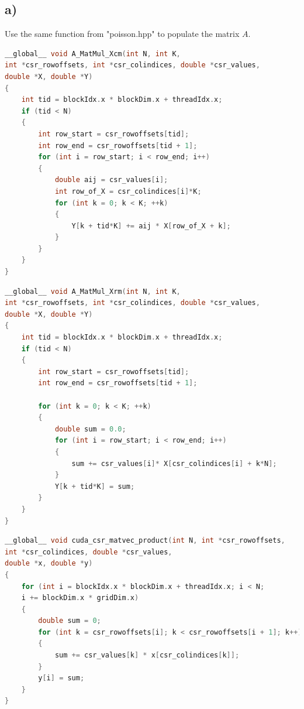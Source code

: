 \documentclass[11pt,a4paper]{article}
\begin{document}
 \subsection*{a)}
Use the same function from "poisson.hpp" to populate the matrix $A$. 
  \begin{lstlisting}[language=C++, caption={Kernel for Column-Major}]
__global__ void A_MatMul_Xcm(int N, int K,
int *csr_rowoffsets, int *csr_colindices, double *csr_values,
double *X, double *Y)
{
	int tid = blockIdx.x * blockDim.x + threadIdx.x; 
	if (tid < N)
	{
		int row_start = csr_rowoffsets[tid];
		int row_end = csr_rowoffsets[tid + 1];
		for (int i = row_start; i < row_end; i++) 
		{
			double aij = csr_values[i];
			int row_of_X = csr_colindices[i]*K;
			for (int k = 0; k < K; ++k)
			{
				Y[k + tid*K] += aij * X[row_of_X + k];
			}
		}
	}
}
 \end{lstlisting}
 
\begin{lstlisting}[language=C++, caption={Kernel for Row-Major}]
__global__ void A_MatMul_Xrm(int N, int K,
int *csr_rowoffsets, int *csr_colindices, double *csr_values,
double *X, double *Y)
{
	int tid = blockIdx.x * blockDim.x + threadIdx.x; 
	if (tid < N)
	{
		int row_start = csr_rowoffsets[tid];
		int row_end = csr_rowoffsets[tid + 1];
		
		for (int k = 0; k < K; ++k)
		{
			double sum = 0.0;
			for (int i = row_start; i < row_end; i++) 
			{
				sum += csr_values[i]* X[csr_colindices[i] + k*N];
			}
			Y[k + tid*K] = sum;
		}
	}
}
\end{lstlisting}
 
\begin{lstlisting}[language=C++, caption={Kernel for Standart Matrix Vector}]
__global__ void cuda_csr_matvec_product(int N, int *csr_rowoffsets,
int *csr_colindices, double *csr_values,
double *x, double *y)
{
	for (int i = blockIdx.x * blockDim.x + threadIdx.x; i < N; 
	i += blockDim.x * gridDim.x) 
	{
		double sum = 0;
		for (int k = csr_rowoffsets[i]; k < csr_rowoffsets[i + 1]; k++) 
		{
			sum += csr_values[k] * x[csr_colindices[k]];
		}
		y[i] = sum;
	}
}
\end{lstlisting}
\end{document}
